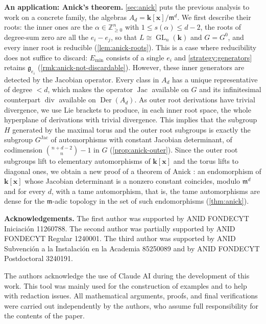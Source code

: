 \documentclass[11pt,letterpaper,reqno]{amsart}
\theoremstyle{remark}
\theoremstyle{definition}
\def\M{\mathfrak{m}}
\def\XX{\mathbf{x}}
\newcommand{\KK}[0]{\ensuremath{\mathbf{k}}}
\newcommand{\ZZ}[0]{\ensuremath{\mathbb{Z}}}
\newcommand{\GL}[0]{\ensuremath{\operatorname{GL}}}
\newcommand{\Der}[0]{\ensuremath{\operatorname{Der}}}
\newcommand{\jac}[0]{\ensuremath{\operatorname{Jac}}}
\newcommand{\divi}[0]{\ensuremath{\operatorname{div}}}
\begin{document}
\medskip\noindent\textbf{An application: Anick's theorem.} \cref{sec:anick} puts the previous
analysis to work on a concrete family, the algebras $A_d=\KK[\XX]/\M^d$. We first describe
their roots: the inner ones are the $\alpha\in\ZZ^n_{\geq0}$ with $1\leq s(\alpha)\leq d-2$, the roots of degree-sum zero are all the $e_i-e_j$, so that
$L\cong\GL_n(\KK)$ and $G=G^0$, and every inner root is reducible
(\cref{lem:anick-roots}). This is a case where reducibility does not suffice to discard: $E_{\mathrm{min}}$ consists of a single $e_i$ and \cref{strategy:generators} retains $\mathfrak g_{e_i}$ (\cref{rmk:anick-not-discardable}). However, these inner generators are detected by the Jacobian operator. Every class in $A_d$ has a unique representative of degree $<d$, which makes the operator $\jac$ available on $G$ and its infinitesimal counterpart $\divi$ available on $\Der(A_d)$. As outer root derivations have trivial divergence, we use Lie brackets to produce, in each inner root space, the whole hyperplane of derivations with trivial divergence. This implies that the subgroup $H$ generated by the maximal torus and the outer root subgroups is exactly the subgroup $G^{\jac}$ of automorphisms with constant Jacobian determinant, of codimension $\binom{n+d-2}{n}-1$ in $G$ (\cref{prop:anick-outer}). Since the outer root subgroups lift to elementary automorphisms of $\KK[\XX]$ and the torus lifts to diagonal ones, we obtain a new proof of a theorem of Anick \cite[Theorem~1]{Anick83}: an endomorphism of $\KK[\XX]$ whose Jacobian determinant is a nonzero constant coincides, modulo $\M^d$ and for every $d$, with a tame automorphism, that is, the tame automorphisms are dense for the $\M$-adic topology in the set of such endomorphisms (\cref{thm:anick}).

\medskip

\noindent\textbf{Acknowledgements.} The first author was supported by ANID FONDECYT Iniciaci\'on 11260788. The second author was partially supported by ANID FONDECYT Regular 1240001. The third author was supported by ANID Subvenci\'on a la Instalaci\'on en la Academia 85250089 and by ANID FONDECYT Postdoctoral 3240191.

The authors acknowledge the use of Claude AI during the development of this work. This tool was mainly used for the construction of examples and to help with redaction issues. All mathematical arguments, proofs, and final verifications were carried out independently by the authors, who assume full responsibility for the contents of the paper.
\end{document}
